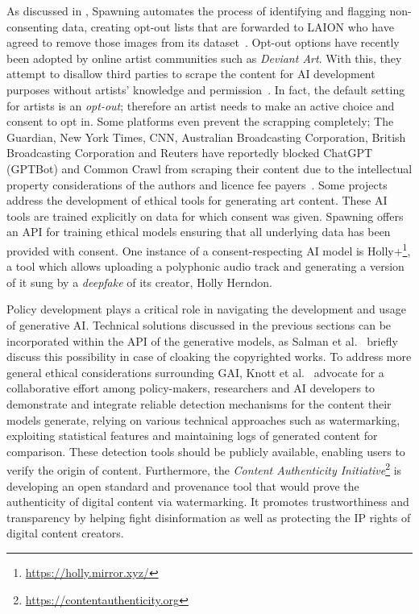 \documentclass[conference,table]{IEEEtran}
\begin{document}
As discussed in , Spawning automates the process of identifying and flagging non-consenting data, creating opt-out lists that are forwarded to LAION who have agreed to remove those images from its dataset~\cite{wu_how_2023}.
Opt-out options have recently been adopted by online artist communities such as \textit{Deviant Art}. 
With this, they attempt to disallow third parties to scrape the content for AI development purposes without artists' knowledge and permission~\cite{wiggers_deviantart_2022}. 
In fact, the default setting for artists is an \textit{opt-out}; therefore an artist needs to make an active choice and consent to opt in. 
Some platforms even prevent the scrapping completely; The Guardian, New York Times, CNN, Australian Broadcasting Corporation, British Broadcasting Corporation and Reuters have reportedly blocked ChatGPT (GPTBot) and Common Crawl from scraping their content due to the intellectual property considerations of the authors and licence fee payers~\cite{bogle_new_2023,marcus_generative_2024}.
Some projects address the development of ethical tools for generating art content. 
These AI tools are trained explicitly on data for which consent was given.
Spawning offers an API for training ethical models ensuring that all underlying data has been provided with consent.
One instance of a consent-respecting AI model is Holly+\footnote{\href{https://holly.mirror.xyz/54ds2IiOnvthjGFkokFCoaI4EabytH9xjAYy1irHy94}{https://holly.mirror.xyz/}}, a tool which allows uploading a polyphonic audio track and generating a version of it sung by a \textit{deepfake} of its creator, Holly Herndon.

Policy development plays a critical role in navigating the development and usage of generative AI. 
Technical solutions discussed in the previous sections can be incorporated within the API of the generative models, as Salman et al.~\cite{salman_raising_2023} briefly discuss this possibility in case of cloaking the copyrighted works. 
To address more general ethical considerations surrounding GAI, Knott et al.~\cite{knott_generative_2023} advocate for a collaborative effort among policy-makers, researchers and AI developers to demonstrate and integrate reliable detection mechanisms for the content their models generate, relying on various technical approaches such as watermarking, exploiting statistical features and maintaining logs of generated content for comparison. These detection tools should be publicly available, enabling users to verify the origin of content. 
Furthermore, the \textit{Content Authenticity Initiative}\footnote{\url{https://contentauthenticity.org}} is developing an open standard and provenance tool that would prove the authenticity of digital content via watermarking. 
It promotes trustworthiness and transparency by helping fight disinformation as well as protecting the IP rights of digital content creators.
\end{document}

